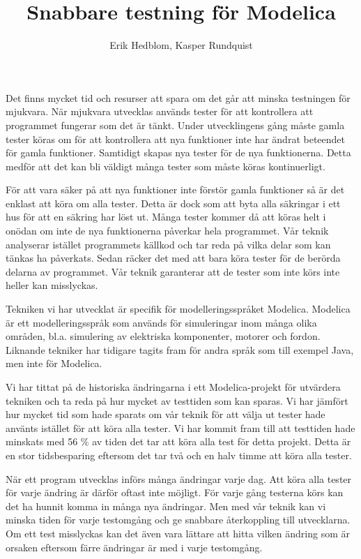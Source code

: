 \documentclass{popsci}
\author{Erik Hedblom, Kasper Rundquist}
\title{Snabbare testning för Modelica}
\begin{document}


{\noindent Det finns mycket tid och resurser att spara om det går att minska testningen för mjukvara. När mjukvara utvecklas används tester för att kontrollera att programmet fungerar som det är tänkt. Under utvecklingens gång måste gamla tester köras om för att kontrollera att nya funktioner inte har ändrat beteendet för gamla funktioner. Samtidigt skapas nya tester för de nya funktionerna. Detta medför att det kan bli väldigt många tester som måste köras kontinuerligt.

För att vara säker på att nya funktioner inte förstör gamla funktioner så är det enklast att köra om alla tester. Detta är dock som att byta alla säkringar i ett hus för att en säkring har löst ut. Många tester kommer då att köras helt i onödan om inte de nya funktionerna påverkar hela programmet. Vår teknik analyserar istället programmets källkod och tar reda på vilka delar som kan tänkas ha påverkats. Sedan räcker det med att bara köra tester för de berörda delarna av programmet. Vår teknik garanterar att de tester som inte körs inte heller kan misslyckas.

Tekniken vi har utvecklat är specifik för modelleringsspråket Modelica. Modelica är ett modelleringsspråk som används för simuleringar inom många olika områden, bl.a. simulering av elektriska komponenter, motorer och fordon. Liknande tekniker har tidigare tagits fram för andra språk som till exempel Java, men inte för Modelica. 

Vi har tittat på de historiska ändringarna i ett Modelica-projekt för utvärdera tekniken och ta reda på hur mycket av testtiden som kan sparas. Vi har jämfört hur mycket tid som hade sparats om vår teknik för att välja ut tester hade använts istället för att köra alla tester. Vi har kommit fram till att testtiden hade minskats med 56 \% av tiden det tar att köra alla test för detta projekt. Detta är en stor tidsbesparing eftersom det tar två och en halv timme att köra alla tester.

När ett program utvecklas införs många ändringar varje dag. Att köra alla tester för varje ändring är därför oftast inte möjligt. För varje gång testerna körs kan det ha hunnit komma in många nya ändringar. Men med vår teknik kan vi minska tiden för varje testomgång och ge snabbare återkoppling till utvecklarna. Om ett test misslyckas kan det även vara lättare att hitta vilken ändring som är orsaken eftersom färre ändringar är med i varje testomgång. 
}
\end{document}
